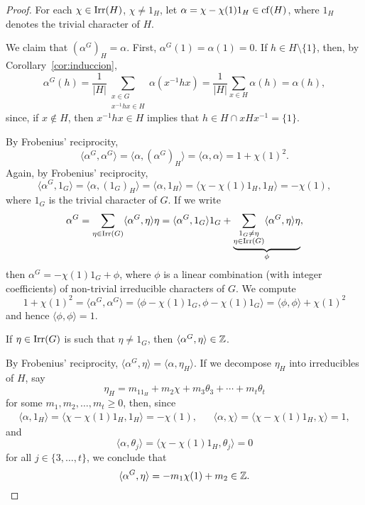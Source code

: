 \begin{proof}
  For each $\chi\in\operatorname{Irr}(H)$, $\chi\ne1_H$, let 
  $\alpha=\chi-\chi(1)1_H\in\operatorname{cf}(H)$, where $1_H$ denotes the trivial character of $H$. 

  We claim that $(\alpha^G)_H=\alpha$.
  First, $\alpha^G(1)=\alpha(1)=0$. If $h\in H\setminus\{1\}$, then, by Corollary~\ref{cor:induccion}, 
  \[
    \alpha^G(h)=\frac{1}{|H|}\sum_{\substack{x\in G\\x^{-1}hx\in H}}\alpha(x^{-1}hx)
    =\frac{1}{|H|}\sum_{x\in H}\alpha(h)=\alpha(h),
  \]
  since, if $x\not\in H$, then $x^{-1}hx\in H$ implies that 
  $h\in H\cap xHx^{-1}=\{1\}$.

  By Frobenius' reciprocity, 
  \begin{equation}
    \label{eq:<a,a>=1+chi2}
    \langle\alpha^G,\alpha^G\rangle
    =\langle\alpha,(\alpha^G)_H\rangle=\langle\alpha,\alpha\rangle
    =1+\chi(1)^2.
  \end{equation}
  Again, by Frobenius' reciprocity, 
  \[
  \langle\alpha^G,1_G\rangle
  =\langle\alpha,(1_G)_H\rangle
  =\langle\alpha,1_H\rangle
  =\langle\chi-\chi(1)1_H,1_H\rangle
  =-\chi(1),
  \]
  where $1_G$ is the trivial character of $G$. If we write 
  \[
  \alpha^G=\sum_{\eta\in\operatorname{Irr}(G)}\langle\alpha^G,\eta\rangle\eta
  =\langle\alpha^G,1_G\rangle1_G+\underbrace{\sum_{\substack{1_G\ne\eta\\\eta\in\operatorname{Irr}(G)}}\langle\alpha^G,\eta\rangle\eta}_{\phi},
  \]
  then $\alpha^G=-\chi(1)1_G+\phi$, where $\phi$ is a linear combination 
  (with integer coefficients) of non-trivial 
  irreducible characters of $G$. We compute 
  \[
  1+\chi(1)^2=\langle\alpha^G,\alpha^G\rangle
  =\langle\phi-\chi(1)1_G,\phi-\chi(1)1_G\rangle
  =\langle\phi,\phi\rangle+\chi(1)^2
  \]
  and hence $\langle\phi,\phi\rangle=1$. 
  
  \begin{claim}
  If $\eta\in\operatorname{Irr}(G)$ is such that $\eta\ne 1_G$, then 
  $\langle\alpha^G,\eta\rangle\in\mathbb{Z}$. 
  \end{claim}
  
  By Frobenius' reciprocity, $\langle\alpha^G,\eta\rangle=\langle\alpha,\eta_H\rangle$. 
  If we decompose $\eta_H$ into irreducibles of $H$, say 
  \[
  \eta_H=m_11_H+m_2\chi+m_3\theta_3+\cdots+m_t\theta_t
  \]
  for some $m_1,m_2,\dots,m_t\geq0$, 
  then, since 
  \begin{align*}
  \langle\alpha,1_H\rangle=\langle\chi-\chi(1)1_H,1_H\rangle=-\chi(1),
  &&\langle\alpha,\chi\rangle=\langle\chi-\chi(1)1_H,\chi\rangle=1,
  \end{align*}
  and 
  \[
  \langle\alpha,\theta_j\rangle=\langle\chi-\chi(1)1_H,\theta_j\rangle=0
  \]
  for all $j\in\{3,\dots,t\}$, we conclude that 
  \[
  \langle\alpha^G,\eta\rangle=-m_1\chi(1)+m_2\in\mathbb{Z}.
  \]
  

\end{proof}
